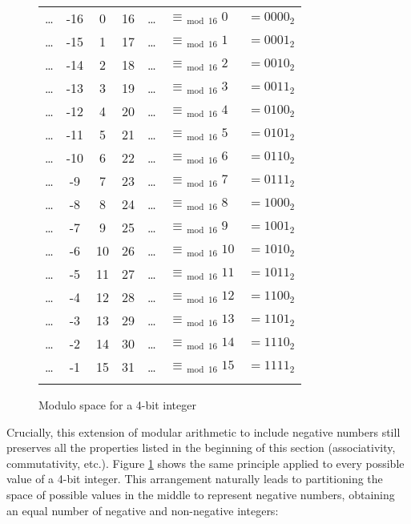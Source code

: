 \begin{figure}[ht]
    \centering
    \begin{tabular}{ccccc|lc}
        \dots & -16 &  0 & 16 & \ldots & $\equiv_{\bmod{16}}  0$ & $= 0000_2$ \\
        \dots & -15 &  1 & 17 & \ldots & $\equiv_{\bmod{16}}  1$ & $= 0001_2$ \\
        \dots & -14 &  2 & 18 & \ldots & $\equiv_{\bmod{16}}  2$ & $= 0010_2$ \\
        \dots & -13 &  3 & 19 & \ldots & $\equiv_{\bmod{16}}  3$ & $= 0011_2$ \\
        \dots & -12 &  4 & 20 & \ldots & $\equiv_{\bmod{16}}  4$ & $= 0100_2$ \\
        \dots & -11 &  5 & 21 & \ldots & $\equiv_{\bmod{16}}  5$ & $= 0101_2$ \\
        \dots & -10 &  6 & 22 & \ldots & $\equiv_{\bmod{16}}  6$ & $= 0110_2$ \\
        \dots &  -9 &  7 & 23 & \ldots & $\equiv_{\bmod{16}}  7$ & $= 0111_2$ \\
        \dots &  -8 &  8 & 24 & \ldots & $\equiv_{\bmod{16}}  8$ & $= 1000_2$ \\
        \dots &  -7 &  9 & 25 & \ldots & $\equiv_{\bmod{16}}  9$ & $= 1001_2$ \\
        \dots &  -6 & 10 & 26 & \ldots & $\equiv_{\bmod{16}} 10$ & $= 1010_2$ \\
        \dots &  -5 & 11 & 27 & \ldots & $\equiv_{\bmod{16}} 11$ & $= 1011_2$ \\
        \dots &  -4 & 12 & 28 & \ldots & $\equiv_{\bmod{16}} 12$ & $= 1100_2$ \\
        \dots &  -3 & 13 & 29 & \ldots & $\equiv_{\bmod{16}} 13$ & $= 1101_2$ \\
        \dots &  -2 & 14 & 30 & \ldots & $\equiv_{\bmod{16}} 14$ & $= 1110_2$ \\
        \dots &  -1 & 15 & 31 & \ldots & $\equiv_{\bmod{16}} 15$ & $= 1111_2$ \\
        \\
    \end{tabular}
    \caption{Modulo space for a 4-bit integer}
    \label{fig:arch:modulo_space}
\end{figure}

Crucially, this extension of modular arithmetic to include negative numbers
still preserves all the properties listed in the beginning of this section
(associativity, commutativity, etc.).  Figure \ref{fig:arch:modulo_space} shows
the same principle applied to every possible value of a 4-bit integer.  This
arrangement naturally leads to partitioning the space of possible values in the
middle to represent negative numbers, obtaining an equal number of negative and
non-negative integers:

